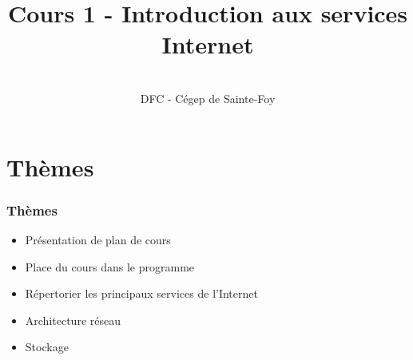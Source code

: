 
 




	
	\title[Intro Internet]{ Cours 1 -
		Introduction aux services Internet}
	\author[\initiales]{\prof \\ DFC - Cégep de Sainte-Foy}
	\institute{\nomcours\\ \cours}
	
	
	\date{\null}
	
	\begin{frame}
		\titlepage
	\end{frame}
	
	
	
	
	
	\section{Thèmes}
	
	\begin{frame}[containsverbatim]
		
		\frametitle{Thèmes}
		
		\begin{itemize}
			\item Présentation de plan de cours
			\item Place du cours dans le programme
			
			\item Répertorier les principaux services de l’Internet
			\item Architecture réseau
			\item Stockage
		\end{itemize}
	\end{frame}
